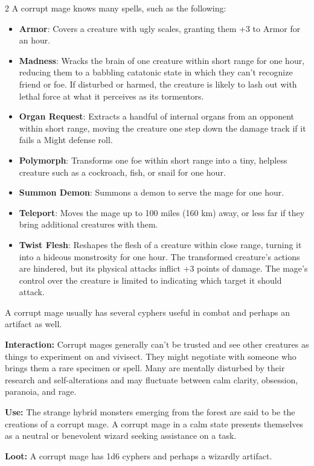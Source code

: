 \begin{multicols}{2}
A corrupt mage knows many spells, such as the following:

\begin{itemize}
\item \textbf{Armor}: Covers a creature with ugly scales, granting them +3 to Armor for an hour. 
\item \textbf{Madness}: Wracks the brain of one creature within short range for one hour, reducing them to a babbling catatonic state in which they can’t recognize friend or foe. If disturbed or harmed, the creature is likely to lash out with lethal force at what it perceives as its tormentors. 
\item \textbf{Organ Request}: Extracts a handful of internal organs from an opponent within short range, moving the creature one step down the damage track if it fails a Might defense roll. 
\item \textbf{Polymorph}: Transforms one foe within short range into a tiny, helpless creature such as a cockroach, fish, or snail for one hour. 
\item \textbf{Summon Demon}: Summons a demon to serve the mage for one hour. 
\item \textbf{Teleport}: Moves the mage up to 100 miles (160 km) away, or less far if they bring additional creatures with them. 
\item \textbf{Twist Flesh}: Reshapes the flesh of a creature within close range, turning it into a hideous monstrosity for one hour. The transformed creature’s actions are hindered, but its physical attacks inflict +3 points of damage. The mage’s control over the creature is limited to indicating which target it should attack. 
\end{itemize}

A corrupt mage usually has several cyphers useful in combat and perhaps an artifact as well. 

\textbf{Interaction:} Corrupt mages generally can’t be trusted and see other creatures as things to experiment on and vivisect. They might negotiate with someone who brings them a rare specimen or spell. Many are mentally disturbed by their research and self-alterations and may fluctuate between calm clarity, obsession, paranoia, and rage. 

\textbf{Use:} The strange hybrid monsters emerging from the forest are said to be the creations of a corrupt mage. A corrupt mage in a calm state presents themselves as a neutral or benevolent wizard seeking assistance on a task. 

\textbf{Loot:} A corrupt mage has 1d6 cyphers and perhaps a wizardly artifact.


\end{multicols}
